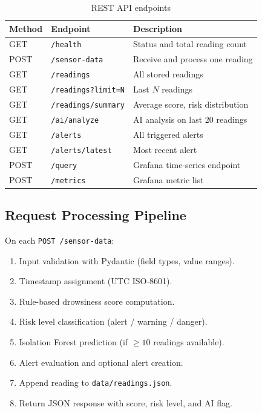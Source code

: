 \documentclass[12pt, a4paper]{article}
\begin{document}
\begin{table}[H]
\centering
\caption{REST API endpoints}
\begin{tabularx}{\textwidth}{llX}
\toprule
\textbf{Method} & \textbf{Endpoint} & \textbf{Description} \\
\midrule
GET  & \texttt{/health}             & Status and total reading count \\
POST & \texttt{/sensor-data}        & Receive and process one reading \\
GET  & \texttt{/readings}           & All stored readings \\
GET  & \texttt{/readings?limit=N}   & Last $N$ readings \\
GET  & \texttt{/readings/summary}   & Average score, risk distribution \\
GET  & \texttt{/ai/analyze}         & AI analysis on last 20 readings \\
GET  & \texttt{/alerts}             & All triggered alerts \\
GET  & \texttt{/alerts/latest}      & Most recent alert \\
POST & \texttt{/query}              & Grafana time-series endpoint \\
POST & \texttt{/metrics}            & Grafana metric list \\
\bottomrule
\end{tabularx}
\end{table}

\subsection{Request Processing Pipeline}

On each \texttt{POST /sensor-data}:

\begin{enumerate}
    \item Input validation with Pydantic (field types, value ranges).
    \item Timestamp assignment (UTC ISO-8601).
    \item Rule-based drowsiness score computation.
    \item Risk level classification (alert / warning / danger).
    \item Isolation Forest prediction (if $\geq 10$ readings available).
    \item Alert evaluation and optional alert creation.
    \item Append reading to \texttt{data/readings.json}.
    \item Return JSON response with score, risk level, and AI flag.
\end{enumerate}
\newpage
\end{document}
